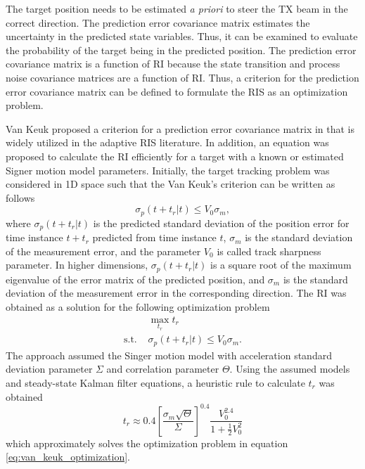 \documentclass[english, 12pt, a4paper, elec, utf8, a-1b, online]{aaltothesis}
\numberwithin{equation}{section}
\def\prior{\textit{a priori}}
\newcommand{\ri}{t_r}
\begin{document}
\newcommand{\ndwells}{{n_d}}


The target position needs to be estimated \prior{} to steer the TX beam in the correct direction. 
The prediction error covariance matrix estimates the uncertainty in the predicted state variables.
Thus, it can be examined to evaluate the probability of the target being in the predicted position.
The prediction error covariance matrix is a function of RI because the state transition and process noise covariance matrices are a function of RI.
Thus, a criterion for the prediction error covariance matrix can be defined to formulate the RIS as an optimization problem.

Van Keuk proposed a criterion for a prediction error covariance matrix in \cite{Keuk1975} that is widely utilized in the adaptive RIS literature.
In addition, an equation was proposed to calculate the RI efficiently for a target with a known or estimated Signer motion model \cite{RongLi2003} parameters.
Initially, the target tracking problem was considered in 1D space such that the Van Keuk's criterion can be written as follows
\begin{equation}\label{eq:criterion}
    \sigma_p(t + \ri | t) \leq V_0 \sigma_m,
\end{equation}
where $\sigma_p(t + \ri | t)$ is the predicted standard deviation of the position error for time instance $t+\ri$ predicted from time instance $t$, $\sigma_m$ is the standard deviation of the measurement error, and the parameter $V_0$ is called track sharpness parameter.
In higher dimensions, $\sigma_p(t + \ri | t)$ is a square root of the maximum eigenvalue of the error matrix of the predicted position, and $\sigma_m$ is the standard deviation of the measurement error in the corresponding direction.
The RI was obtained as a solution for the following optimization problem
\begin{equation}\label{eq:van_keuk_optimization}
\begin{array}{ll}
     & \max_{\ri} \ri \\[7pt]
    \text{s.t. } &\sigma_p(t + \ri | t) \leq V_0 \sigma_m. 
\end{array}
\end{equation}
The approach assumed the Singer motion model with acceleration standard deviation parameter $\Sigma$ and correlation parameter $\Theta$.
Using the assumed models and steady-state Kalman filter equations, a heuristic rule to calculate $\ri$ was obtained
\begin{equation}\label{eq:keuk_time}
    \ri \approx 0.4 \left[ \frac{\sigma_m \sqrt{\Theta}}{\Sigma} \right]^{0.4} \frac{V_0^{2.4}}{1+\frac{1}{2}V_0^2}
\end{equation}
which approximately solves the optimization problem in equation \eqref{eq:van_keuk_optimization}.
\end{document}
